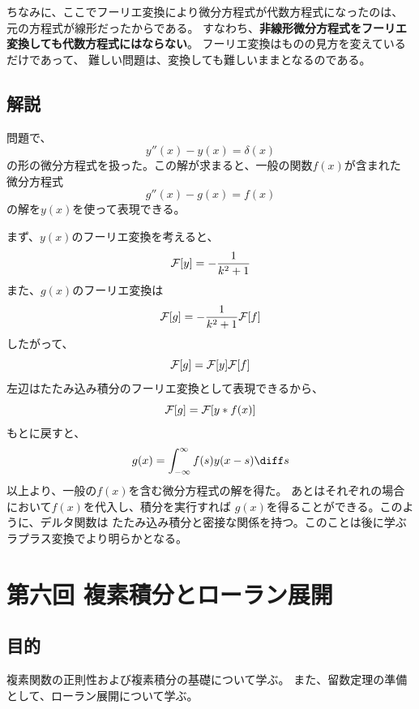 ちなみに、ここでフーリエ変換により微分方程式が代数方程式になったのは、
元の方程式が線形だったからである。
すなわち、{\bf 非線形微分方程式をフーリエ変換しても代数方程式にはならない}。
フーリエ変換はものの見方を変えているだけであって、
難しい問題は、変換しても難しいままとなるのである。

\subsection{解説}

問題で、
$$
  y''(x) - y(x) = \delta(x)
$$
の形の微分方程式を扱った。この解が求まると、一般の関数$f(x)$が含まれた
微分方程式
$$
  g''(x) - g(x) = f(x)
$$
の解を$y(x)$を使って表現できる。

まず、$y(x)$のフーリエ変換を考えると、
\begin{equation}
  {\cal F}[y] = -\frac{1}{k^2+1}
\end{equation}
また、$g(x)$のフーリエ変換は
\begin{equation}
  {\cal F}[g] = -\frac{1}{k^2+1} {\cal F}[f]
\end{equation}
したがって、
\begin{equation}
  {\cal F}[g] = {\cal F}[y] {\cal F}[f]
\end{equation}
左辺はたたみ込み積分のフーリエ変換として表現できるから、
\begin{equation}
  {\cal F}[g] = {\cal F}[y*f(x)]
\end{equation}
もとに戻すと、
\begin{equation}
  g(x) = \int_{-\infty}^{\infty}f(s) y(x-s)  \diff s
\end{equation}
以上より、一般の$f(x)$を含む微分方程式の解を得た。
あとはそれぞれの場合において$f(x)$を代入し、積分を実行すれば
$g(x)$を得ることができる。このように、デルタ関数は
たたみ込み積分と密接な関係を持つ。このことは後に学ぶ
ラプラス変換でより明らかとなる。


\newpage
\section{第六回 複素積分とローラン展開}

\subsection{目的}

複素関数の正則性および複素積分の基礎について学ぶ。
また、留数定理の準備として、ローラン展開について学ぶ。

